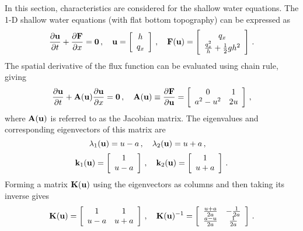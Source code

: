 In this section, characteristics are considered for the shallow water equations.
The 1-D shallow water equations (with flat bottom topography) can be expressed as
\begin{equation}\label{eq:1dshallowwater}
  \ppt{\vectorsolution} + \pd{\consfluxvector}{x}
  = \mathbf{0} \eqc \quad
  \vectorsolution = \sq{\begin{array}{c}\height\\\heightmomentumx\end{array}} \eqc \quad
  \consfluxvector(\vectorsolution)
    = \left[\begin{array}{c}
      \heightmomentumx\\
      \frac{\heightmomentumx^2}{\height} + \half\gravity\height^2
    \end{array}\right]
  \eqp
\end{equation}
The spatial derivative of the flux function can be evaluated using chain rule, giving
\begin{equation}
  \ppt{\vectorsolution} + \jacobianx(\vectorsolution)\pd{\vectorsolution}{x}
  = \mathbf{0} \eqc \quad
  \jacobianx(\vectorsolution) \equiv \pd{\consfluxvector}{\vectorsolution} =
    \sq{\begin{array}{c c}0 & 1\\
      \speedofsound^2-\velocityx^2 & 2\velocityx\end{array}} \eqc
\end{equation}
where $\mathbf{A}(\mathbf{u})$ is referred to as the Jacobian matrix. The
eigenvalues and corresponding eigenvectors of this matrix are
\begin{equation}
  \lambda_1(\mathbf{u}) = u - a \,, \quad
  \lambda_2(\mathbf{u}) = u + a \,, \quad
\end{equation}
\begin{equation}
  \mathbf{k}_1(\mathbf{u}) = \left[\begin{array}{c}
    1\\u-a\end{array}\right] \,, \quad
  \mathbf{k}_2(\mathbf{u}) = \left[\begin{array}{c}
    1\\u+a\end{array}\right] \,.
\end{equation}
Forming a matrix $\mathbf{K}(\mathbf{u})$ using the eigenvectors
as columns and then taking its inverse gives
\begin{equation}
  \mathbf{K}(\mathbf{u}) = \left[\begin{array}{c c}
    1 & 1\\u-a & u+a\end{array}\right] \,, \quad
  \mathbf{K}(\mathbf{u})^{-1} = \left[\begin{array}{c c}
    \frac{u+a}{2a} & -\frac{1}{2a}\\
    \frac{a-u}{2a} & \frac{1}{2a}
    \end{array}\right] \,.
\end{equation}
